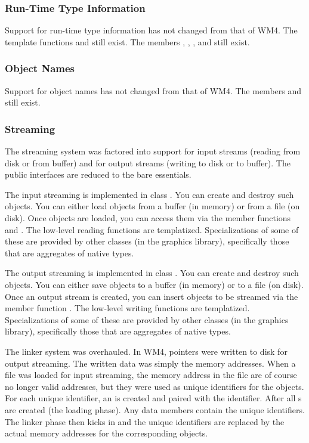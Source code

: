 \documentclass{article}
\begin{document}
\subsubsection{Run-Time Type Information}

Support for run-time type information has not changed from that of WM4.  The
template functions  and  still exist.  The
 members , , ,
and  still exist.

\subsubsection{Object Names}

Support for object names has not changed from that of WM4.  The 
members  and  still exist.

\subsubsection{Streaming}

The streaming system was factored into support for input streams (reading from
disk or from buffer) and for output streams (writing to disk or to buffer).  The
public interfaces are reduced to the bare essentials.

The input streaming is implemented in class .  You can create and
destroy such objects.  You can either load objects from a buffer (in memory) or from
a file (on disk).  Once objects are loaded, you can access them via the member
functions  and .  The low-level reading
functions are templatized.  Specializations of some of these are provided by
other classes (in the graphics library), specifically those that are aggregates
of native types.

The output streaming is implemented in class .  You can create and
destroy such objects.  You can either save objects to a buffer (in memory) or to
a file (on disk).  Once an output stream is created, you can insert objects to
be streamed via the member function .  The low-level writing
functions are templatized.  Specializations of some of these are provided by
other classes (in the graphics library), specifically those that are aggregates
of native types.

The linker system was overhauled.  In WM4,  pointers were written
to disk for output streaming.  The written data was simply the memory addresses.
When a file was loaded for input streaming, the memory address in the file are
of course no longer valid addresses, but they were used as unique identifiers
for the objects.  For each unique identifier, an  is created and
paired with the identifier.  After all s are created (the loading
phase).  Any  data members contain the unique identifiers.  The
linker phase then kicks in and the unique identifiers are replaced by the
actual memory addresses for the corresponding objects.
\end{document}

